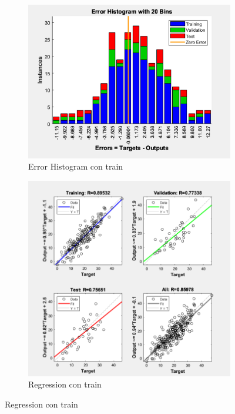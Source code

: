 \documentclass[a4paper, 12pt]{article}
\begin{document}
\begin{figure}[htp!]
\begin{subfigure}{0.49\textwidth}
                    \end{subfigure}
                    \begin{subfigure}{0.49\textwidth}
                        \includegraphics[width=\textwidth]{figures/parte1/Ej3/Ej3_error_train.png}
                        \caption{Error Histogram con train}
                    \end{subfigure}
                    \begin{subfigure}{0.49\textwidth}
                        \includegraphics[width=\textwidth]{figures/parte1/Ej3/Ej3_regression_train.png}
                        \caption{Regression con train}
                    \end{subfigure}
                \end{figure}
\end{document}
